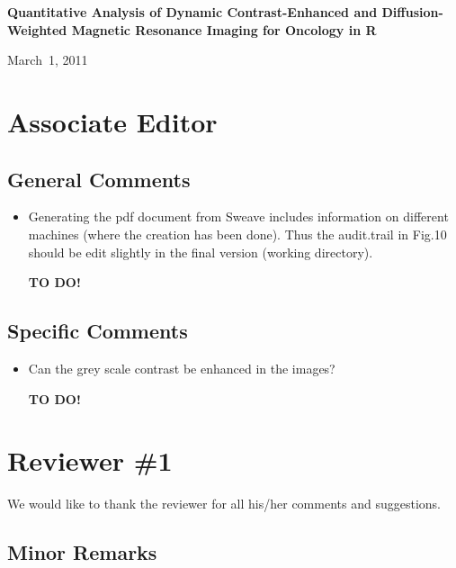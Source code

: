 \documentclass[11pt]{article}
\begin{document}

\begin{center}
{\Large \textbf{Quantitative Analysis of Dynamic Contrast-Enhanced and Diffusion-Weighted Magnetic Resonance Imaging for Oncology in \textsf{R}}}

\bigskip

March~1, 2011

\end{center}

\section*{Associate Editor}

\subsection*{General Comments}

\begin{itemize}

\item Generating the pdf document from Sweave includes information on
  different machines (where the creation has been done).  Thus the
  audit.trail in Fig.10 should be edit slightly in the final version
  (working directory).

  \textbf{TO DO!}

\end{itemize}

\subsection*{Specific Comments}

\begin{itemize}

\item Can the grey scale contrast be enhanced in the images?

  \textbf{TO DO!}

\end{itemize}

\section*{Reviewer \#1}

We would like to thank the reviewer for all his/her comments and
suggestions.

\subsection*{Minor Remarks}
\end{document}
